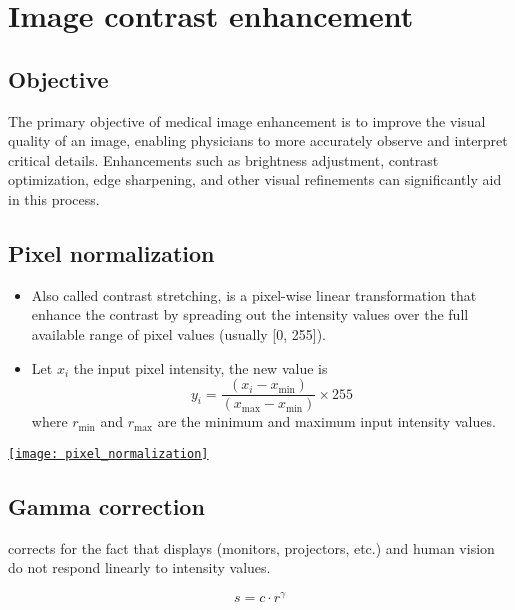 \chapter{Image contrast enhancement}

\section{Objective}
The primary objective of medical image enhancement is to improve the
visual quality of an image, enabling physicians to more accurately
observe and interpret critical details. Enhancements such as
brightness adjustment, contrast optimization, edge sharpening, and
other visual refinements can significantly aid in this process.

\section{Pixel normalization}
\begin{itemize}
\item Also called contrast stretching, is a pixel-wise linear
  transformation that enhance the contrast by spreading out the
  intensity values over the full available range of pixel values
  (usually [0, 255]).
\item Let $x_i$ the input pixel intensity, the new value is
  \begin{equation}
    y_i = \frac{(x_i - x_{\min})}{(x_{\max} - x_{\min})} \times 255
  \end{equation}
  where $r_{\text{min}}$ and $r_{\text{max}}$ are the minimum and
  maximum input intensity values.
\end{itemize}
\begin{center}
  \href{https://github.com/vicente-gonzalez-ruiz/medical_imaging/blob/main/notebooks/pixel_normalization.ipynb}{\texttt{[image: pixel\_normalization]}}
\end{center}

\section{Gamma correction}

corrects for the fact that displays (monitors, projectors, etc.) and human vision do not respond linearly to intensity values.

\begin{equation}
s = c \cdot r^{\gamma}
\end{equation}

